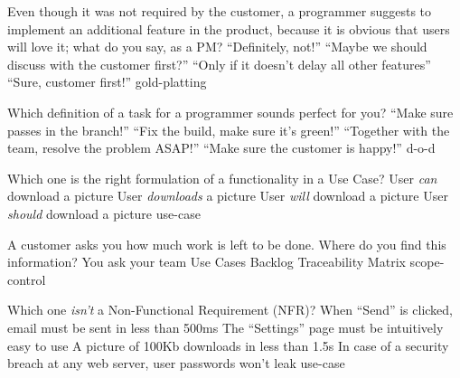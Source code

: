 \documentclass{article}
\begin{document}


\pmbaQuestion
  {Even though it was not required by the customer, a programmer suggests to implement an additional feature in the product, because it is obvious that users will love it; what do you say, as a PM?}
  {``Definitely, not!''}
  {``Maybe we should discuss with the customer first?''}
  {``Only if it doesn't delay all other features''}
  {``Sure, customer first!''}
  {gold-platting}

\pmbaQuestion
  {Which definition of a task for a programmer sounds perfect for you?}
  {``Make sure  passes in the  branch!''}
  {``Fix the build, make sure it's green!''}
  {``Together with the team, resolve the problem ASAP!''}
  {``Make sure the customer is happy!''}
  {d-o-d}

\pmbaQuestion
  {Which one is the right formulation of a functionality in a Use Case?}
  {User \emph{can} download a picture}
  {User \emph{downloads} a picture}
  {User \emph{will} download a picture}
  {User \emph{should} download a picture}
  {use-case}

\pmbaQuestion
  {A customer asks you how much work is left to be done. Where do you find this information?}
  {You ask your team}
  {Use Cases}
  {Backlog}
  {Traceability Matrix}
  {scope-control}

\pmbaQuestion
  {Which one \emph{isn't} a Non-Functional Requirement (NFR)?}
  {When ``Send'' is clicked, email must be sent in less than 500ms}
  {The ``Settings'' page must be intuitively easy to use}
  {A picture of 100Kb downloads in less than 1.5s}
  {In case of a security breach at any web server, user passwords won't leak}
  {use-case}
\end{document}
